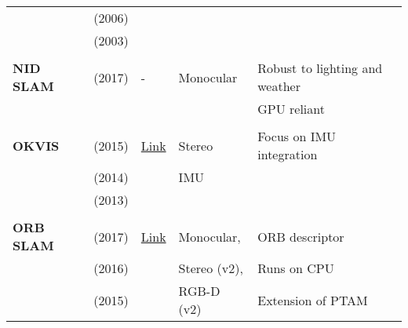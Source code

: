 \documentclass[a4paper,12pt]{scrartcl}
\begin{document}
{\begin{longtable}{l|l|l|l|l}
                           & \cite{Howard2006} (2006)          &                                                                    &                       &\\
                           & \cite{Liu2003} (2003)             &                                                                    &                       &\\
                           &                                   &                                                                    &                       &\\
    \textbf{NID SLAM}      & \cite{Pascoe2017} (2017)          & -                                                                  & Monocular             & Robust to lighting and weather\\
                           &                                   &                                                                    &                       & GPU reliant\\
                           &                                   &                                                                    &                       &\\
    \textbf{OKVIS}         & \cite{Leutenegger2015} (2015)     & {\href{https://github.com/ethz-asl/okvis_ros}{Link}}               & Stereo                & Focus on IMU integration\\
                           & \cite{Leutenegger2014} (2014)     &                                                                    & IMU                   &\\
                           & \cite{Leutenegger2013} (2013)     &                                                                    &                       &\\
                           &                                   &                                                                    &                       &\\
    \textbf{ORB SLAM}      & \cite{Mur-Artal2017} (2017)       & \href{https://github.com/raulmur/ORB_SLAM2}{Link}                  &  Monocular,           & ORB descriptor\\
                           & \cite{Mur-Artal2016a} (2016)      &                                                                    &  Stereo (v2),         & Runs on CPU\\
                           & \cite{Mur-Artal2015} (2015)       &                                                                    &  RGB-D (v2)           & Extension of PTAM\\

\end{longtable}}
\end{document}
